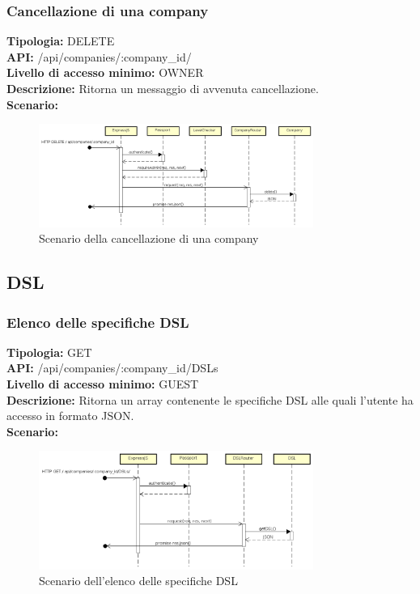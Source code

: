 \newpage
\subsubsection{Cancellazione di una company}
\textbf{Tipologia:} DELETE \\
\textbf{API:} /api/companies/:company\_id/ \\
\textbf{Livello di accesso minimo:} OWNER \\
\textbf{Descrizione:} Ritorna un messaggio di avvenuta cancellazione. \\
\textbf{Scenario:} 
\begin{figure}[h]
\centering
\includegraphics[width=0.8\textwidth]{res/sections/backend/(DELETE)company.png}
\caption{Scenario della cancellazione di una company}
\end{figure}

\newpage
\subsection{DSL}
\subsubsection{Elenco delle specifiche DSL}
\textbf{Tipologia:} GET \\
\textbf{API:} /api/companies/:company\_id/DSLs \\
\textbf{Livello di accesso minimo:} GUEST \\
\textbf{Descrizione:} Ritorna un array contenente le specifiche DSL alle quali l'utente ha accesso in formato JSON. \\
\textbf{Scenario:} 
\begin{figure}[h]
\centering
\includegraphics[width=0.8\textwidth]{res/sections/backend/(GET)dsl.png}
\caption{Scenario dell'elenco delle specifiche DSL}
\end{figure}

